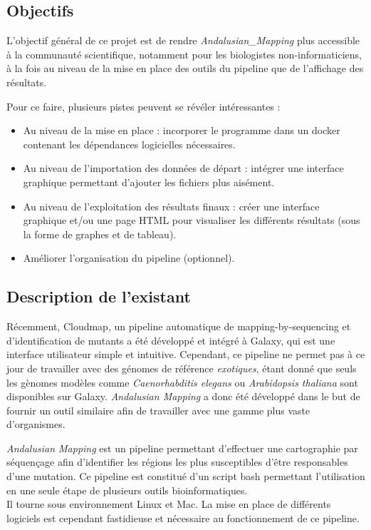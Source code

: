 \documentclass[12pt]{article}
\begin{document}
\subsection{Objectifs}

L'objectif général de ce projet est de rendre \textit{Andalusian\_Mapping} plus accessible à la communauté scientifique, notamment pour les biologistes non-informaticiens, à la fois au niveau de la mise en place des outils du pipeline que de l'affichage des résultats.

Pour ce faire, plusieurs pistes peuvent se révéler intéressantes : 

\begin{itemize}
\item Au niveau de la mise en place : incorporer le programme dans un docker contenant les dépendances logicielles nécessaires.
\item Au niveau de l'importation des données de départ : intégrer une interface graphique permettant d'ajouter les fichiers plus aisément.
\item Au niveau de l'exploitation des résultats finaux : créer une interface graphique et/ou une page HTML pour visualiser les différents résultats (sous la forme de graphes et de tableau).
\item Améliorer l'organisation du pipeline (optionnel).
\end{itemize}

\subsection{Description de l'existant}

Récemment, Cloudmap, un pipeline automatique de mapping-by-sequencing et d'identification de mutants a été développé et intégré à Galaxy, qui est une interface utilisateur simple et intuitive.
Cependant, ce pipeline ne permet pas à ce jour de travailler avec des génomes de référence \textit{exotiques}, étant donné que seuls les gènomes modèles comme \textit{Caenorhabditis elegans} ou \textit{Arabidopsis thaliana} sont disponibles sur Galaxy.
\textit{Andalusian Mapping} a donc été développé dans le but de fournir un outil similaire afin de travailler avec une gamme plus vaste d'organismes.

\textit{Andalusian Mapping} est un pipeline permettant d'effectuer une cartographie par séquençage afin d'identifier les régions les plus susceptibles d'être responsables d'une mutation.
Ce pipeline est constitué d'un script bash permettant l'utilisation en une seule étape de plusieurs outils bioinformatiques. \\
Il tourne sous environnement Linux et Mac. La mise en place de différents logiciels est cependant fastidieuse et nécessaire au fonctionnement de ce pipeline.
\end{document}
